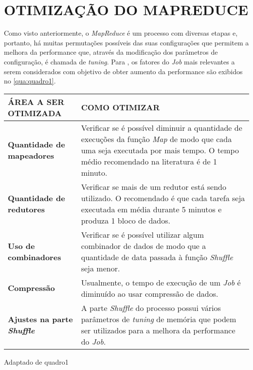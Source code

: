 \chapter{OTIMIZAÇÃO DO MAPREDUCE} \label{cha:otimizacaomapreduce}

Como visto anteriormente, o \textit{MapReduce} é um processo com diversas etapas e, portanto, há muitas permutações possíveis das suas configurações que permitem a melhora da performance que, através da modificação dos parâmetros de configuração, é chamada de \textit{tuning}. Para \textcite{HadoopBook15}, os fatores do \textit{Job} mais relevantes a serem considerados com objetivo de obter aumento da performance são exibidos no \autoref{qua:quadro1}.

{\footnotesize
  \centering
  \begin{tabular}{|p{50mm}|p{100mm}|}\hline
    \textbf{ÁREA A SER OTIMIZADA}              & \textbf{COMO OTIMIZAR}                                                                                                                                                                       \\\hline
    \textbf{Quantidade de mapeadores}          & Verificar se é possível diminuir a quantidade de execuções da função \textit{Map} de modo que cada uma seja executada por mais tempo. O tempo médio recomendado na literatura é de 1 minuto. \\\hline
    \textbf{Quantidade de redutores}           & Verificar se mais de um redutor está sendo utilizado. O recomendado é que cada tarefa seja executada em média durante 5 minutos e produza 1 bloco de dados.                                  \\\hline
    \textbf{Uso de combinadores}               & Verificar se é possível utilizar algum combinador de dados de modo que a quantidade de data passada à função \textit{Shuffle} seja menor.                                                    \\\hline
    \textbf{Compressão}                        & Usualmente, o tempo de execução de um \textit{Job} é diminuído ao usar compressão de dados.                                                                                                  \\\hline
    \textbf{Ajustes na parte \textit{Shuffle}} & A parte \textit{Shuffle} do processo possui vários parâmetros de \textit{\gls{tuning}} de memória que podem ser utilizados para a melhora da performance do \textit{Job}.                    \\\hline
  \end{tabular}}
{Adaptado de \cite{HadoopBook15}}{quadro1}{}{}





